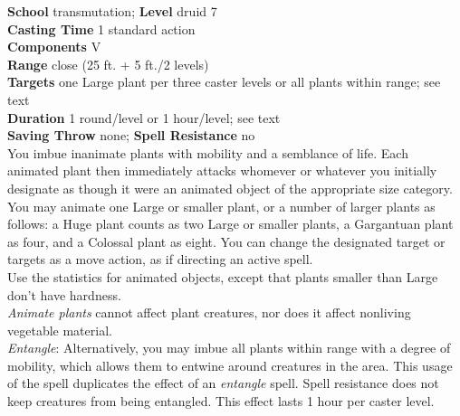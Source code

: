 \textbf{School} transmutation; \textbf{Level} druid 7\\
\textbf{Casting Time} 1 standard action\\
\textbf{Components} V\\
\textbf{Range} close (25 ft. + 5 ft./2 levels)\\
\textbf{Targets} one Large plant per three caster levels or all plants within range; see text\\
\textbf{Duration} 1 round/level or 1 hour/level; see text\\
\textbf{Saving Throw} none; \textbf{Spell Resistance} no\\
You imbue inanimate plants with mobility and a semblance of life. Each animated plant then immediately attacks whomever or whatever you initially designate as though it were an animated object of the appropriate size category. You may animate one Large or smaller plant, or a number of larger plants as follows: a Huge plant counts as two Large or smaller plants, a Gargantuan plant as four, and a Colossal plant as eight. You can change the designated target or targets as a move action, as if directing an active spell.\\
Use the statistics for animated objects, except that plants smaller than Large don't have hardness.\\
\textit{Animate plants }cannot affect plant creatures, nor does it affect nonliving vegetable material.\\
\textit{Entangle}: Alternatively, you may imbue all plants within range with a degree of mobility, which allows them to entwine around creatures in the area. This usage of the spell duplicates the effect of an \textit{entangle }spell. Spell resistance does not keep creatures from being entangled. This effect lasts 1 hour per caster level.\\
